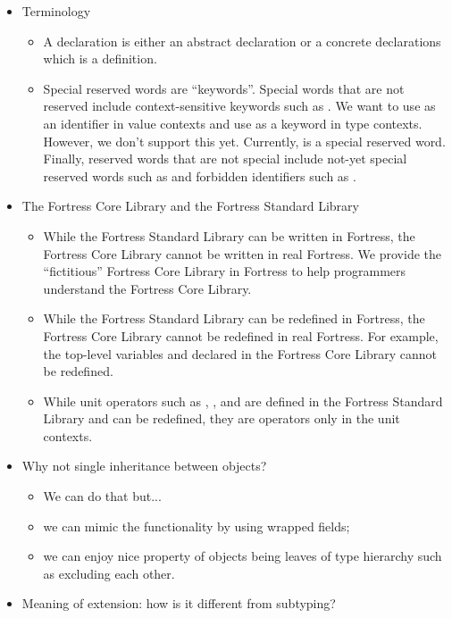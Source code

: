 \begin{itemize}
\item Terminology
  \begin{itemize}
  \item A declaration is either an abstract declaration or a concrete
  declarations which is a definition.
  \item Special reserved words are ``keywords''.  Special words that are
  not reserved include context-sensitive keywords such as .  We
  want to use  as an identifier in value contexts and use
   as a keyword in type contexts.  However, we don't support this
  yet.  Currently,  is a special reserved word.  Finally,
  reserved words that are not special include not-yet special reserved
  words such as  and forbidden identifiers such as
  .
  \end{itemize}

\item The Fortress Core Library and the Fortress Standard Library
  \begin{itemize}
  \item While the Fortress Standard Library can be written in Fortress, the
  Fortress Core Library cannot be written in real Fortress.  We provide the
  ``fictitious'' Fortress Core Library in Fortress to help programmers
  understand the Fortress Core Library.
  \item While the Fortress Standard Library can be redefined in Fortress, the
  Fortress Core Library cannot be redefined in real Fortress.
  For example, the top-level variables  and  declared in
  the Fortress Core Library cannot be redefined.
  \item While unit operators such as , , and
   are defined in the Fortress Standard Library and can be
  redefined, they are operators only in the unit contexts.
  \end{itemize}

\item Why not single inheritance between objects?
  \begin{itemize}
  \item We can do that but...
  \item we can mimic the functionality by using wrapped fields;
  \item we can enjoy nice property of objects being leaves of type
  hierarchy such as excluding each other.
  \end{itemize}

\item Meaning of extension: how is it different from subtyping?


\end{itemize}

